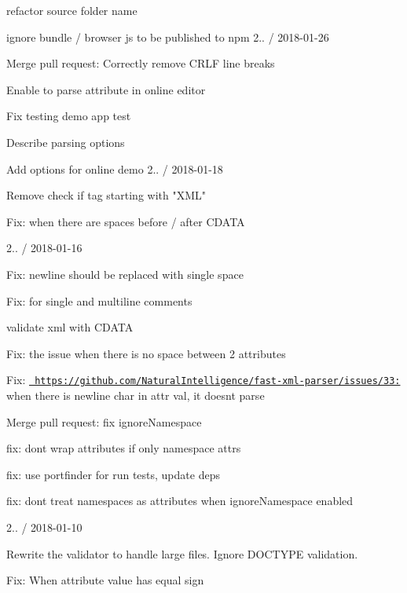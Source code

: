 \begin{DoxyItemize}
\item refactor source folder name
\item ignore bundle / browser js to be published to npm 2.. / 2018-\/01-\/26
\item Merge pull request\+: Correctly remove CRLF line breaks
\item Enable to parse attribute in online editor
\item Fix testing demo app test
\item Describe parsing options
\item Add options for online demo 2.. / 2018-\/01-\/18
\item Remove check if tag starting with "{}\+XML"{}
\item Fix\+: when there are spaces before / after CDATA
\end{DoxyItemize}

2.. / 2018-\/01-\/16
\begin{DoxyItemize}
\item Fix\+: newline should be replaced with single space
\item Fix\+: for single and multiline comments
\item validate xml with CDATA
\item Fix\+: the issue when there is no space between 2 attributes
\item Fix\+: \href{https://github.com/NaturalIntelligence/fast-xml-parser/issues/33:}{\texttt{ https\+://github.\+com/\+Natural\+Intelligence/fast-\/xml-\/parser/issues/33\+:}} when there is newline char in attr val, it doesn\textquotesingle{}t parse
\item Merge pull request\+: fix ignore\+Namespace
\begin{DoxyItemize}
\item fix\+: don\textquotesingle{}t wrap attributes if only namespace attrs
\item fix\+: use portfinder for run tests, update deps
\item fix\+: don\textquotesingle{}t treat namespaces as attributes when ignore\+Namespace enabled
\end{DoxyItemize}
\end{DoxyItemize}

2.. / 2018-\/01-\/10
\begin{DoxyItemize}
\item Rewrite the validator to handle large files. Ignore DOCTYPE validation.
\item Fix\+: When attribute value has equal sign
\end{DoxyItemize}

